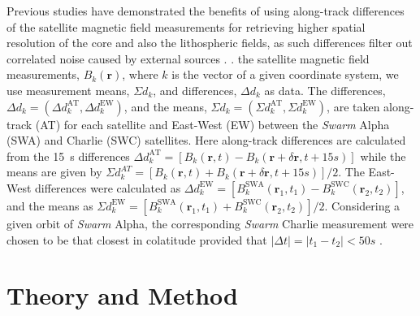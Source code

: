 \documentclass[extra,mreferee]{gji}
\begin{document}
Previous studies have demonstrated the benefits of using along-track differences of the satellite magnetic field measurements for retrieving higher spatial resolution of the core and also the lithospheric fields, as such differences filter out correlated noise caused by external sources \citep{Olsen_etal_2015,Kotsiaros_etal_2015,Kotsiaros_2016,Finlay_2019}.  \citep{Sabaka_etal_2013,Hammer_2018}.  the satellite magnetic field measurements, $B_k(\mathbf{r})$, where $k$ is the  vector  of a given coordinate system, we use measurement means, $\Sigma d_k$, and differences, $\Delta d_k$ as data. The differences, $\Delta d_k=(\Delta d_k^{\mathrm{AT}},\Delta d_k^{\mathrm{EW}})$, and the means, $\Sigma d_k=(\Sigma d_k^{\mathrm{AT}},\Sigma d_k^{\mathrm{EW}})$, are taken along-track (AT) for each satellite and East-West (EW) between the \textit{Swarm} Alpha (SWA) and Charlie (SWC) satellites. Here along-track differences are calculated from the 15~s differences $\Delta d_k^{\mathrm{AT}} = [B_k(\mathbf{r},t) - B_k(\mathbf{r}+\delta \mathbf{r},t+15s)]$ while the means are given by $\Sigma d_k^{AT} = [B_k(\mathbf{r},t) + B_k(\mathbf{r}+\delta \mathbf{r},t+15s)]/2$. The East-West differences were calculated as $\Delta d_k^{\mathrm{EW}} = [B_k^{\mathrm{SWA}}(\mathbf{r}_1,t_1) - B_k^{\mathrm{SWC}}(\mathbf{r}_2,t_2)]$, and the means as $\Sigma d_k^{\mathrm{EW}} = [B_k^{\mathrm{SWA}}(\mathbf{r}_1,t_1) + B_k^{\mathrm{SWC}}(\mathbf{r}_2,t_2)]/2$. Considering a given orbit of \textit{Swarm} Alpha, the corresponding \textit{Swarm} Charlie measurement were chosen to be that closest in colatitude provided that $\vert\Delta t\vert=\vert t_1-t_2\vert<50s$ \citep{Olsen_etal_2015}. 


\section{Theory and Method}
\label{sec:4}
\end{document}
